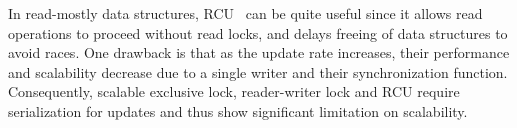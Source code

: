 In read-mostly data structures, RCU~\cite{McKenney98} can be quite useful
since it allows read operations to proceed without read locks, and delays
freeing of data structures to avoid races. One drawback is that as the update
rate increases, their performance and scalability decrease due to a single
writer and their synchronization function.
Consequently, 
scalable exclusive lock, reader-writer lock
and RCU require serialization for updates and thus show significant limitation
 on scalability. 









 


